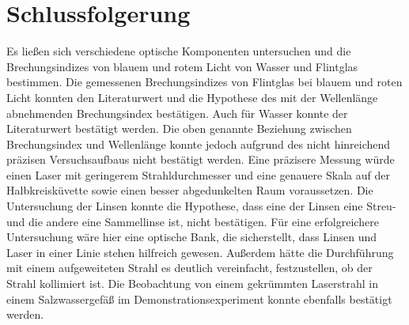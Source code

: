 \documentclass[
	a4paper,
	12pt,
	pagesize,
	ngerman
]{scrartcl}
\begin{document}
	\section{Schlussfolgerung}
	Es ließen sich verschiedene optische Komponenten untersuchen und die Brechungsindizes von blauem und rotem Licht von Wasser und Flintglas bestimmen.
	Die gemessenen Brechungsindizes von Flintglas bei blauem und roten Licht konnten den Literaturwert und die Hypothese des mit der Wellenlänge abnehmenden Brechungsindex bestätigen.
	Auch für Wasser konnte der Literaturwert bestätigt werden.
	Die oben genannte Beziehung zwischen Brechungsindex und Wellenlänge konnte jedoch aufgrund des nicht hinreichend präzisen Versuchsaufbaus nicht bestätigt werden.
	Eine präzisere Messung würde einen Laser mit geringerem Strahldurchmesser und eine genauere Skala auf der Halbkreisküvette sowie einen besser abgedunkelten Raum voraussetzen. %
	Die Untersuchung der Linsen konnte die Hypothese, dass eine der Linsen eine Streu- und die andere eine Sammellinse ist, nicht bestätigen.
	Für eine erfolgreichere Untersuchung wäre hier eine optische Bank, die sicherstellt, dass Linsen und Laser in einer Linie stehen hilfreich gewesen.
	Außerdem hätte die Durchführung mit einem aufgeweiteten Strahl es deutlich vereinfacht, festzustellen, ob der Strahl kollimiert ist.
	Die Beobachtung von einem gekrümmten Laserstrahl in einem Salzwassergefäß im Demonstrationsexperiment konnte ebenfalls bestätigt werden.
	\printbibliography
\end{document}
